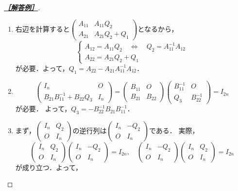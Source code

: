 \documentclass[uplatex,dvipdfmx]{jsarticle}
\begin{document}
\begin{proof}[\textbf{\underline{［解答例］}}]\mbox{}
    \begin{enumerate}
        \item 右辺を計算すると$\begin{pmatrix}A_{11}&A_{11}Q_2\\A_{21}&A_{21}Q_2+Q_1\end{pmatrix}$となるから，
        \[\begin{cases}
            A_{12}=A_{11}Q_2\quad\Leftrightarrow\quad Q_2=A_{11}^{-1}A_{12}\\
            A_{22}=A_{21}Q_2+Q_1
        \end{cases}\]
        が必要．よって，$Q_1=A_{22}-A_{21}A_{11}^{-1}A_{12}$．
        \item 
        \[\begin{pmatrix}I_n&O\\B_{21}B_{11}^{-1}+B_{22}Q_3&I_n\end{pmatrix}=\begin{pmatrix}
            B_{11}&O\\B_{21}&B_{22}
        \end{pmatrix}\begin{pmatrix}B_{11}^{-1}&O\\Q_3&B_{22}^{-1}\end{pmatrix}=I_{2n}\]
        が必要．
        よって，$Q_3=-B_{22}^{-1}B_{21}B_{11}^{-1}$．
        \item まず，$\begin{pmatrix}I_n&Q_2\\O&I_n\end{pmatrix}$の逆行列は$\begin{pmatrix}I_n&-Q_2\\O&I_n\end{pmatrix}$である．
        実際，
        \[\begin{pmatrix}I_n&Q_2\\O&I_n\end{pmatrix}\begin{pmatrix}I_n&-Q_2\\O&I_n\end{pmatrix}=I_{2n},\quad \begin{pmatrix}I_n&-Q_2\\O&I_n\end{pmatrix}\begin{pmatrix}I_n&Q_2\\O&I_n\end{pmatrix}=I_{2n}\]
        が成り立つ．よって，

\end{enumerate}
\end{proof}
\end{document}
